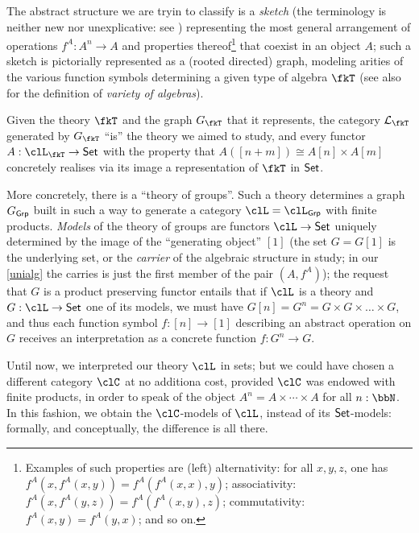 The abstract structure we are tryin to classify is a \emph{sketch} (the terminology is neither new nor unexplicative: see \cite{ehresmann1968esquisses,coppey1984leccons, Bor2}) representing the most general arrangement of operations $f^A: A^n \to A$ and properties thereof\footnote{Examples of such properties are (left) alternativity: for all $x,y,z$, one has $f^A(x,f^A(x,y)) = f^A(f^A(x,x),y)$; associativity: $f^A(x,f^A(y,z)) = f^A(f^A(x,y),z)$; commutativity: $f^A(x,y)=f^A(y,x)$; and so on.} that coexist in an object $A$; such a sketch is pictorially represented as a (rooted directed) graph, modeling arities of the various function symbols determining a given type of algebra $\fkT$ (see also \cite[XV.3]{grillet2007abstract} for the definition of \emph{variety of algebras}).%

Given the theory $\fkT$ and the graph $G_{\fkT}$ that it represents, the category $\mathcal{L}_{\fkT}$ generated by $G_\fkT$ ``is'' the theory we aimed to study, and every functor $A: \clL_{\fkT} \to \Set$ with the property that $A([n+m]) \cong A[n] \times A[m]$ concretely realises via its image a representation of $\fkT$ in $\mathsf{Set}$.

More concretely, there is a ``theory of groups''. Such a theory determines a graph $G_{\mathsf{Grp}}$ built in such a way to generate a category $\clL=\clL_{\cate{Grp}}$ with finite products. \emph{Models} of the theory of groups are functors $\clL \to \Set$ uniquely determined by the image of the ``generating object'' $[1]$ (the set $G=G[1]$ is the underlying set, or the \emph{carrier} of the algebraic structure in study; in our \autoref{unialg} the carries is just the first member of the pair $(A,f^A)$); the request that $G$ is a product preserving functor entails that if $\clL$ is a theory and $G: \clL \to \Set$ one of its models, we must have $G[n]=G^n = G \times G \times\dots\times G$, and thus each function symbol $f: [n]\to [1]$ describing an abstract operation on $G$ receives an interpretation as a concrete function $f: G^n \to G$.

Until now, we interpreted our theory $\clL$ in sets; but we could have chosen a different category $\clC$ at no additiona cost, provided $\clC$ was endowed with finite products, in order to speak of the object $A^n = A\times \cdots\times A$ for all $n: \bbN$. In this fashion, we obtain the $\clC$-models of $\clL$, instead of its $\mathsf{Set}$-models: formally, and conceptually, the difference is all there.

